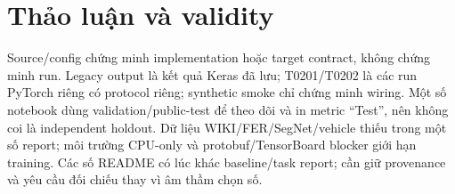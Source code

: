 \section{Thảo luận và validity}
Source/config chứng minh implementation hoặc target contract, không chứng minh run. Legacy output là kết quả Keras đã lưu; T0201/T0202 là các run PyTorch riêng có protocol riêng; synthetic smoke chỉ chứng minh wiring. Một số notebook dùng validation/public-test để theo dõi và in metric “Test”, nên không coi là independent holdout. Dữ liệu WIKI/FER/SegNet/vehicle thiếu trong một số report; môi trường CPU-only và protobuf/TensorBoard blocker giới hạn training. Các số README có lúc khác baseline/task report; cần giữ provenance và yêu cầu đối chiếu thay vì âm thầm chọn số.